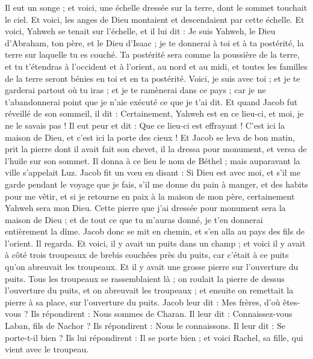 \begin{multicols}{2}
Il eut un songe ; et voici, une échelle dressée sur la terre, dont le sommet touchait le ciel. Et voici, les anges de Dieu montaient et descendaient par cette échelle.
Et voici, Yahweh se tenait sur l'échelle, et il lui dit : Je suis Yahweh, le Dieu d'Abraham, ton père, et le Dieu d'Isaac ; je te donnerai à toi et à ta postérité, la terre sur laquelle tu es couché.
Ta postérité sera comme la poussière de la terre, et tu t'étendras à l'occident et à l'orient, au nord et au midi, et toutes les familles de la terre seront bénies en toi et en ta postérité.
Voici, je suis avec toi ; et je te garderai partout où tu iras ; et je te ramènerai dans ce pays ; car je ne t'abandonnerai point que je n'aie exécuté ce que je t'ai dit.
Et quand Jacob fut réveillé de son sommeil, il dit : Certainement, Yahweh est en ce lieu-ci, et moi, je ne le savais pas !
Il eut peur et dit : Que ce lieu-ci est effrayant ! C'est ici la maison de Dieu, et c'est ici la porte des cieux !
Et Jacob se leva de bon matin, prit la pierre dont il avait fait son chevet, il la dressa pour monument, et versa de l'huile sur son sommet.
Il donna à ce lieu le nom de Béthel ; mais auparavant la ville s'appelait Luz.
Jacob fit un vœu en disant : Si Dieu est avec moi, et s'il me garde pendant le voyage que je fais, s'il me donne du pain à manger, et des habits pour me vêtir,
et si je retourne en paix à la maison de mon père, certainement Yahweh sera mon Dieu.
Cette pierre que j'ai dressée pour monument sera la maison de Dieu ; et de tout ce que tu m'auras donné, je t'en donnerai entièrement la dîme.
\VerseOne{}Jacob donc se mit en chemin, et s'en alla au pays des fils de l’orient.
Il regarda. Et voici, il y avait un puits dans un champ ; et voici il y avait à côté trois troupeaux de brebis couchées près du puits, car c’était à ce puits qu’on abreuvait les troupeaux.  Et il y avait une grosse pierre sur l'ouverture du puits.
Tous les troupeaux se rassemblaient là ; on roulait la pierre de dessus l'ouverture du puits, et on abreuvait les troupeaux ; et ensuite on remettait la pierre à sa place, sur l'ouverture du puits.
Jacob leur dit : Mes frères, d'où êtes-vous ? Ils répondirent : Nous sommes de Charan.
Il leur dit : Connaissez-vous Laban, fils de Nachor ? Ils répondirent : Nous le connaissons.
Il leur dit : Se porte-t-il bien ? Ils lui répondirent : Il se porte bien ; et voici Rachel, sa fille, qui vient avec le troupeau.

\end{multicols}
